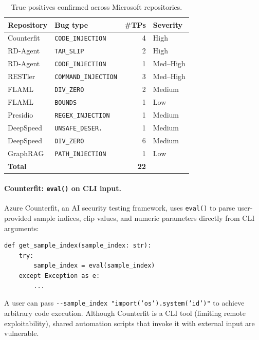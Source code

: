 \documentclass[sigconf,review,anonymous]{acmart}
\begin{document}
\begin{table}[t]
\caption{True positives confirmed across Microsoft repositories.}\label{tab:msrepos}
\centering
\small
\begin{tabular}{llrl}
\toprule
\textbf{Repository} & \textbf{Bug type} & \textbf{\#TPs} & \textbf{Severity} \\
\midrule
Counterfit     & \texttt{CODE\_INJECTION}     & 4 & High \\
RD-Agent       & \texttt{TAR\_SLIP}            & 2 & High \\
RD-Agent       & \texttt{CODE\_INJECTION}     & 1 & Med--High \\
RESTler        & \texttt{COMMAND\_INJECTION}  & 3 & Med--High \\
FLAML          & \texttt{DIV\_ZERO}           & 2 & Medium \\
FLAML          & \texttt{BOUNDS}              & 1 & Low \\
Presidio       & \texttt{REGEX\_INJECTION}    & 1 & Medium \\
DeepSpeed      & \texttt{UNSAFE\_DESER.}      & 1 & Medium \\
DeepSpeed      & \texttt{DIV\_ZERO}           & 6 & Medium \\
GraphRAG       & \texttt{PATH\_INJECTION}     & 1 & Low \\
\midrule
\textbf{Total} &                              & \textbf{22} & \\
\bottomrule
\end{tabular}
\end{table}

\paragraph{Counterfit: \texttt{eval()} on CLI input.}
Azure Counterfit, an AI security testing framework, uses \texttt{eval()} to parse user-provided sample indices, clip values, and numeric parameters directly from CLI arguments:
\begin{lstlisting}
def get_sample_index(sample_index: str):
    try:
        sample_index = eval(sample_index)
    except Exception as e:
        ...
\end{lstlisting}
A user can pass \texttt{-{}-sample\_index "\textunderscore\textunderscore import\textunderscore\textunderscore('os').system('id')"} to achieve arbitrary code execution.
Although Counterfit is a CLI tool (limiting remote exploitability), shared automation scripts that invoke it with external input are vulnerable.
\end{document}
